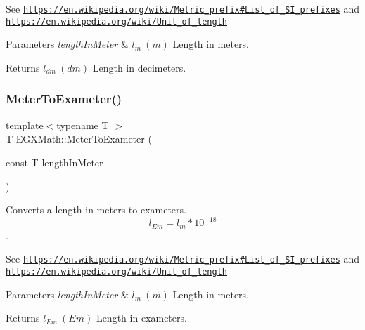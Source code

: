 See \href{https://en.wikipedia.org/wiki/Metric_prefix#List_of_SI_prefixes}{\tt https\+://en.\+wikipedia.\+org/wiki/\+Metric\+\_\+prefix\#\+List\+\_\+of\+\_\+\+S\+I\+\_\+prefixes} and \href{https://en.wikipedia.org/wiki/Unit_of_length}{\tt https\+://en.\+wikipedia.\+org/wiki/\+Unit\+\_\+of\+\_\+length} 
\begin{DoxyParams}{Parameters}
{\em length\+In\+Meter} & $ l_{m}\ (m)$ Length in meters. \\
\hline
\end{DoxyParams}
\begin{DoxyReturn}{Returns}
$ l_{dm}\ (dm)$ Length in decimeters. 
\end{DoxyReturn}
\mbox{\label{group___e_g_x_math-_conversions-_length_conversions-_meter-_s_i_gadee48ed1b24c416ef0289dc4d803504b}} 
\subsubsection{\texorpdfstring{Meter\+To\+Exameter()}{MeterToExameter()}}
{\footnotesize\ttfamily template$<$typename T $>$ \\
T E\+G\+X\+Math\+::\+Meter\+To\+Exameter (\begin{DoxyParamCaption}\item[{const T}]{length\+In\+Meter }\end{DoxyParamCaption})}



Converts a length in meters to exameters. \[ l_{Em}=l_{m} * 10^{-18} \]. 

See \href{https://en.wikipedia.org/wiki/Metric_prefix#List_of_SI_prefixes}{\tt https\+://en.\+wikipedia.\+org/wiki/\+Metric\+\_\+prefix\#\+List\+\_\+of\+\_\+\+S\+I\+\_\+prefixes} and \href{https://en.wikipedia.org/wiki/Unit_of_length}{\tt https\+://en.\+wikipedia.\+org/wiki/\+Unit\+\_\+of\+\_\+length} 
\begin{DoxyParams}{Parameters}
{\em length\+In\+Meter} & $ l_{m}\ (m)$ Length in meters. \\
\hline
\end{DoxyParams}
\begin{DoxyReturn}{Returns}
$ l_{Em}\ (Em)$ Length in exameters. 
\end{DoxyReturn}
\mbox{\label{group___e_g_x_math-_conversions-_length_conversions-_meter-_s_i_ga9fbb9437aa02f79a445e8c6177d0153e}} 
